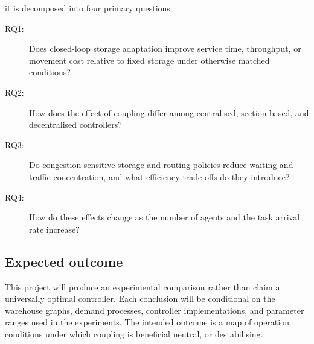\documentclass[../main.tex]{subfiles}
\begin{document}
it is decomposed into four primary questions: 
\begin{description}
  \item[RQ1:] Does closed-loop storage adaptation improve service time,
  throughput, or movement cost relative to fixed storage under otherwise
  matched conditions?
  \item[RQ2:] How does the effect of coupling differ among centralised,
  section-based, and decentralised controllers?
  \item[RQ3:] Do congestion-sensitive storage and routing policies reduce
  waiting and traffic concentration, and what efficiency trade-offs do they
  introduce?
  \item[RQ4:] How do these effects change as the number of agents and the task
  arrival rate increase?
\end{description}


\subsection{Expected outcome}
This project will produce an experimental comparison rather than claim a universally optimal controller. Each conclusion will be conditional on the warehouse graphs, demand processes, controller implementations, and parameter ranges used in the experiments. The intended outcome is a map of operation conditions under which coupling is beneficial neutral, or destabilising.
\end{document}
